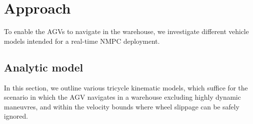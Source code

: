 \chapter{Approach}\label{chap:approach}
To enable the \ac{AGV}s to navigate in the warehouse, we investigate different vehicle models intended for a real-time N\ac{MPC} deployment.

\section{Analytic model}\label{appr_kinematics}
In this section, we outline various tricycle kinematic models, which suffice for the scenario in which the \ac{AGV} navigates in a warehouse excluding highly dynamic maneuvres, and within the velocity bounds where wheel slippage can be safely ignored.

